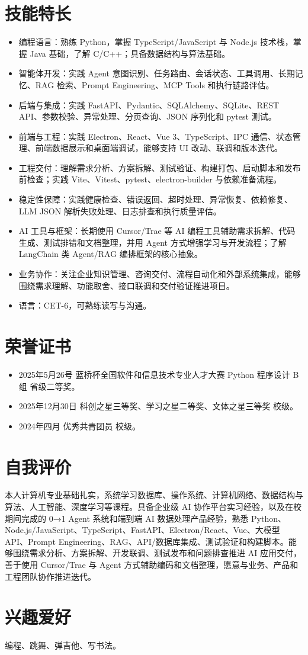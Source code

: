 \documentclass[11pt,a4paper,fontset=none]{ctexart}
\begin{document}
\section{技能特长}
\begin{itemize}
  \item 编程语言：熟练 Python，掌握 TypeScript/JavaScript 与 Node.js 技术栈，掌握 Java 基础，了解 C/C++；具备数据结构与算法基础。
  \item 智能体开发：实践 Agent 意图识别、任务路由、会话状态、工具调用、长期记忆、RAG 检索、Prompt Engineering、MCP Tools 和执行链路评估。
  \item 后端与集成：实践 FastAPI、Pydantic、SQLAlchemy、SQLite、REST API、参数校验、异常处理、分页查询、JSON 序列化和 pytest 测试。
  \item 前端与工程：实践 Electron、React、Vue 3、TypeScript、IPC 通信、状态管理、前端数据展示和桌面端调试，能够支持 UI 改动、联调和版本迭代。
  \item 工程交付：理解需求分析、方案拆解、测试验证、构建打包、启动脚本和发布前检查；实践 Vite、Vitest、pytest、electron-builder 与依赖准备流程。
  \item 稳定性保障：实践健康检查、错误返回、超时处理、异常恢复、依赖修复、LLM JSON 解析失败处理、日志排查和执行质量评估。
  \item AI 工具与框架：长期使用 Cursor/Trae 等 AI 编程工具辅助需求拆解、代码生成、测试排错和文档整理，并用 Agent 方式增强学习与开发流程；了解 LangChain 类 Agent/RAG 编排框架的核心抽象。
  \item 业务协作：关注企业知识管理、咨询交付、流程自动化和外部系统集成，能够围绕需求理解、功能取舍、接口联调和交付验证推进项目。
  \item 语言：CET-6，可熟练读写与沟通。
\end{itemize}

\section{荣誉证书}
\begin{itemize}
  \item 2025年5月26号 \quad 蓝桥杯全国软件和信息技术专业人才大赛 Python 程序设计 B 组 \quad 省级二等奖。
  \item 2025年12月30日 \quad 科创之星三等奖、学习之星二等奖、文体之星三等奖 \quad 校级。
  \item 2024年四月 \quad 优秀共青团员 \quad 校级。
\end{itemize}

\section{自我评价}
本人计算机专业基础扎实，系统学习数据库、操作系统、计算机网络、数据结构与算法、人工智能、深度学习等课程。具备企业级 AI 协作平台实习经验，以及在校期间完成的 0→1 Agent 系统和端到端 AI 数据处理产品经验，熟悉 Python、Node.js/JavaScript、TypeScript、FastAPI、Electron/React、Vue、大模型 API、Prompt Engineering、RAG、API/数据库集成、测试验证和构建脚本。能够围绕需求分析、方案拆解、开发联调、测试发布和问题排查推进 AI 应用交付，善于使用 Cursor/Trae 与 Agent 方式辅助编码和文档整理，愿意与业务、产品和工程团队协作推进迭代。

\section{兴趣爱好}
编程、跳舞、弹吉他、写书法。
\end{document}
